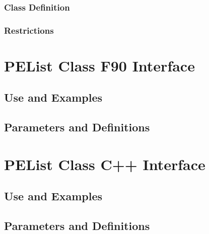 \documentclass[]{article}
\begin{document}
\subsubsection{Class Definition}




\subsubsection{Restrictions}

%


\section{PEList Class F90 Interface}

\subsection{Use and Examples}

%


\subsection{Parameters and Definitions}

%



%


\section{PEList Class C++ Interface}

\subsection{Use and Examples}




\subsection{Parameters and Definitions}

%


\end{document}
